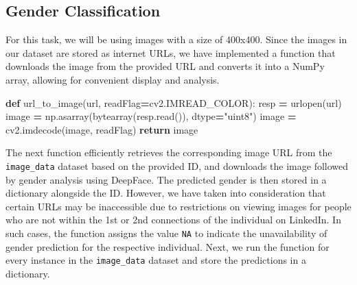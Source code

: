 \documentclass[11pt,]{article}
\newenvironment{Shaded}{\begin{snugshade}}{\end{snugshade}}
\newcommand{\BuiltInTok}[1]{#1}
\newcommand{\ControlFlowTok}[1]{\textcolor[rgb]{0.13,0.29,0.53}{\textbf{#1}}}
\newcommand{\KeywordTok}[1]{\textcolor[rgb]{0.13,0.29,0.53}{\textbf{#1}}}
\newcommand{\NormalTok}[1]{#1}
\newcommand{\OperatorTok}[1]{\textcolor[rgb]{0.81,0.36,0.00}{\textbf{#1}}}
\newcommand{\StringTok}[1]{\textcolor[rgb]{0.31,0.60,0.02}{#1}}
\begin{document}
\hypertarget{gender-classification}{%
\subsection{Gender Classification}\label{gender-classification}}

For this task, we will be using images with a size of 400x400. Since the
images in our dataset are stored as internet URLs, we have implemented a
function that downloads the image from the provided URL and converts it
into a NumPy array, allowing for convenient display and analysis.

\begin{Shaded}
\begin{Highlighting}[]
\KeywordTok{def}\NormalTok{ url\_to\_image(url, readFlag}\OperatorTok{=}\NormalTok{cv2.IMREAD\_COLOR):}
\NormalTok{    resp }\OperatorTok{=}\NormalTok{ urlopen(url)}
\NormalTok{    image }\OperatorTok{=}\NormalTok{ np.asarray(}\BuiltInTok{bytearray}\NormalTok{(resp.read()), dtype}\OperatorTok{=}\StringTok{"uint8"}\NormalTok{)}
\NormalTok{    image }\OperatorTok{=}\NormalTok{ cv2.imdecode(image, readFlag)}
    \ControlFlowTok{return}\NormalTok{ image}
\end{Highlighting}
\end{Shaded}

The next function efficiently retrieves the corresponding image URL from
the \texttt{image\_data} dataset based on the provided ID, and downloads
the image followed by gender analysis using DeepFace. The predicted
gender is then stored in a dictionary alongside the ID. However, we have
taken into consideration that certain URLs may be inaccessible due to
restrictions on viewing images for people who are not within the 1st or
2nd connections of the individual on LinkedIn. In such cases, the
function assigns the value \texttt{NA} to indicate the unavailability of
gender prediction for the respective individual. Next, we run the
function for every instance in the \texttt{image\_data} dataset and
store the predictions in a dictionary.
\end{document}
